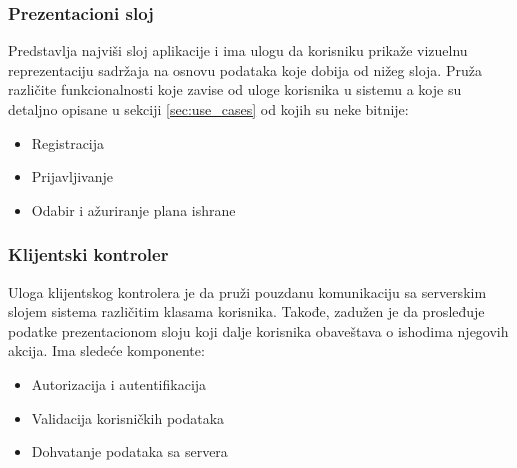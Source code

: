 \subsubsection{Prezentacioni sloj}
Predstavlja najviši sloj aplikacije i ima ulogu da korisniku prikaže vizuelnu reprezentaciju sadržaja na osnovu podataka koje dobija od nižeg sloja. Pruža različite funkcionalnosti koje zavise od uloge korisnika u sistemu a koje su detaljno opisane u sekciji \ref{sec:use_cases} od kojih su neke bitnije:
\begin{itemize}
\item Registracija
\item Prijavljivanje
\item Odabir i ažuriranje plana ishrane
\end{itemize}


\subsubsection{Klijentski kontroler}
Uloga klijentskog kontrolera je da pruži pouzdanu komunikaciju sa serverskim slojem sistema različitim klasama korisnika. Takođe, zadužen je da prosleđuje podatke prezentacionom sloju koji dalje korisnika obaveštava o ishodima njegovih akcija. Ima sledeće komponente: 
\begin{itemize}
    \item Autorizacija i autentifikacija
    \item Validacija korisničkih podataka
    \item Dohvatanje podataka sa servera
\end{itemize}
